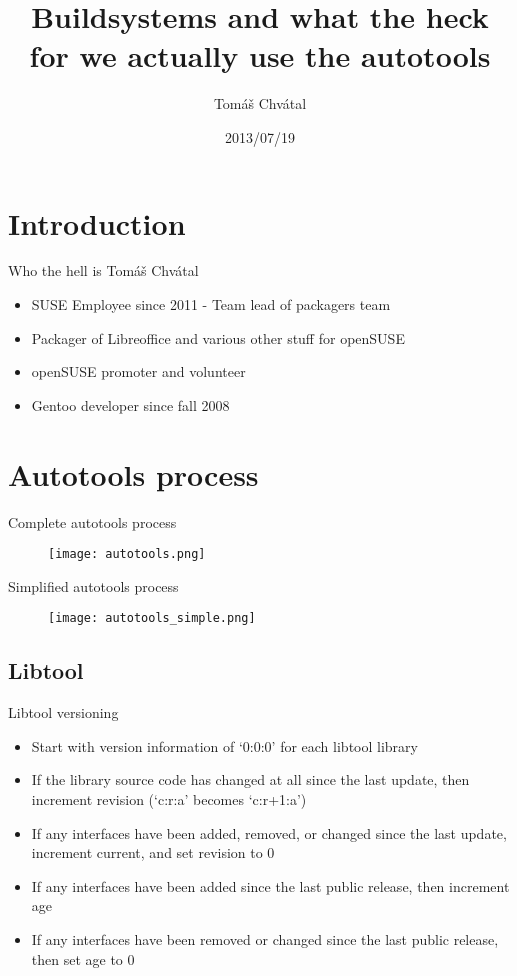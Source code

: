 \documentclass{beamer}
\author{Tom\'{a}\v{s} Chv\'{a}tal\newline {\small SUSE Packagers team}}
\title{Buildsystems and what the heck for we actually use the autotools}
\date{2013/07/19}
\begin{document}
\begin{frame}[t,plain]
\titlepage
\end{frame}

\section{Introduction}

\begin{frame}[t]{Who the hell is Tomáš Chvátal}
	\begin{itemize}
	\item SUSE Employee since 2011 - Team lead of packagers team
	\item Packager of Libreoffice and various other stuff for openSUSE
	\item openSUSE promoter and volunteer
	\item Gentoo developer since fall 2008
	\end{itemize}
\end{frame}

\section{Autotools process}

\begin{frame}{Complete autotools process}
	\begin{figure}
	\texttt{[image: autotools.png]}
	\end{figure}
\end{frame}

\begin{frame}{Simplified autotools process}
	\begin{figure}
	\texttt{[image: autotools\_simple.png]}
	\end{figure}
\end{frame}

\subsection{Libtool}

\begin{frame}{Libtool versioning}
	\begin{itemize}
	\item Start with version information of ‘0:0:0’ for each libtool library
	\item If the library source code has changed at all since the last update, then increment revision (‘c:r:a’ becomes ‘c:r+1:a’)
	\item If any interfaces have been added, removed, or changed since the last update, increment current, and set revision to 0
	\item If any interfaces have been added since the last public release, then increment age
	\item If any interfaces have been removed or changed since the last public release, then set age to 0
	\end{itemize}
\end{frame}
\end{document}
